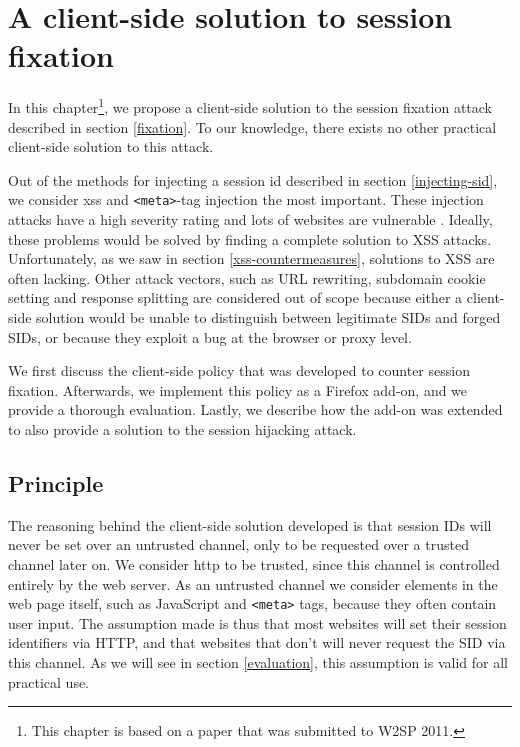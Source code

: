 \chapter{A client-side solution to session fixation}\label{fixation-solution}
In this chapter\footnote{This chapter is based on a paper that was submitted to W2SP 2011.}, we propose a client-side solution to the \gls{session fixation} attack described in section \ref{fixation}. To our knowledge, there exists no other practical client-side solution to this attack.

Out of the methods for injecting a \gls{session id} described in section \ref{injecting-sid}, we consider \gls{xss} and \texttt{<meta>}-tag injection the most important. These injection attacks have a high severity rating \cite{Williams2010} and lots of websites are vulnerable \cite{Brown2010}. Ideally, these problems would be solved by finding a complete solution to XSS attacks. Unfortunately, as we saw in section \ref{xss-countermeasures}, solutions to XSS are often lacking. Other attack vectors, such as URL rewriting, subdomain cookie setting and response splitting are considered out of scope because either a client-side solution would be unable to distinguish between legitimate SIDs and forged SIDs, or because they exploit a bug at the browser or proxy level.

We first discuss the client-side policy that was developed to counter session fixation. Afterwards, we implement this policy as a Firefox add-on, and we provide a thorough evaluation. Lastly, we describe how the add-on was extended to also provide a solution to the session hijacking attack.

\section{Principle}

The reasoning behind the client-side solution developed is that session IDs will never be set over an untrusted channel, only to be requested over a trusted channel later on. We consider \gls{http} to be trusted, since this channel is controlled entirely by the web server. As an untrusted channel we consider elements in the web page itself, such as JavaScript and \texttt{<meta>} tags, because they often contain user input. The assumption made is thus that most websites will set their session identifiers via HTTP, and that websites that don't will never request the SID via this channel. As we will see in section \ref{evaluation}, this assumption is valid for all practical use.

